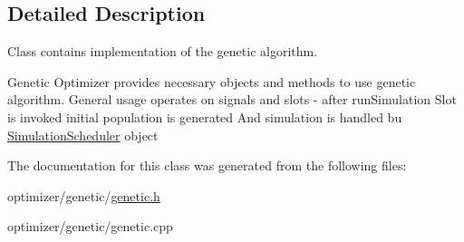 \subsection{Detailed Description}
Class contains implementation of the genetic algorithm. 

Genetic Optimizer provides necessary objects and methods to use genetic algorithm. General usage operates on signals and slots -\/ after run\+Simulation Slot is invoked initial population is generated And simulation is handled bu \hyperlink{class_simulation_scheduler}{Simulation\+Scheduler} object 

The documentation for this class was generated from the following files\+:\begin{DoxyCompactItemize}
\item 
optimizer/genetic/\hyperlink{genetic_8h}{genetic.\+h}\item 
optimizer/genetic/genetic.\+cpp\end{DoxyCompactItemize}
